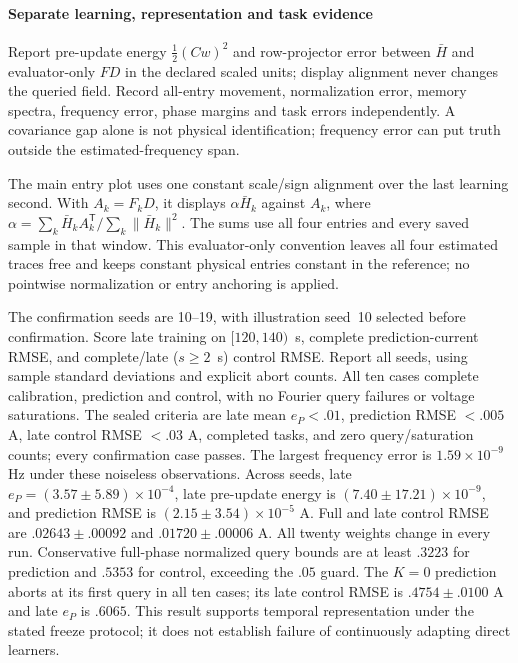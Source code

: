 \paragraph{Separate learning, representation and task evidence}
Report pre-update energy $\tfrac12(Cw)^2$ and row-projector error between
$\bar H$ and evaluator-only $FD$ in the declared scaled units; display
alignment never changes the queried field. Record all-entry movement,
normalization error, memory spectra, frequency error, phase margins and task
errors independently. A covariance gap alone is not physical identification;
frequency error can put truth outside the estimated-frequency span.

The main entry plot uses one constant scale/sign alignment over the last
learning second. With $A_k=F_kD$, it displays $\alpha\bar H_k$ against $A_k$,
where $\alpha=\sum_k\bar H_kA_k^{\mathsf T}/\sum_k\|\bar H_k\|^2$.
The sums use all four entries and every saved sample in that window. This
evaluator-only convention leaves all four estimated traces free and keeps
constant physical entries constant in the reference; no pointwise normalization
or entry anchoring is applied.

The confirmation seeds are 10--19, with illustration seed~10 selected before
confirmation. Score late training on $[120,140)$~s, complete prediction-current
RMSE, and complete/late ($s\ge2$~s) control RMSE. Report all seeds, using sample standard deviations and explicit abort counts.
All ten cases complete calibration, prediction and control, with no Fourier
query failures or voltage saturations. The sealed criteria are late mean
$e_P<.01$, prediction RMSE $<.005$ A, late control RMSE $<.03$ A,
completed tasks, and zero query/saturation counts; every confirmation case
passes. The largest frequency error is $1.59\times10^{-9}$ Hz under these
noiseless observations. Across seeds, late $e_P=(3.57\pm5.89)\times10^{-4}$,
late pre-update energy is $(7.40\pm17.21)\times10^{-9}$, and prediction RMSE
is $(2.15\pm3.54)\times10^{-5}$ A. Full and late control RMSE are
$.02643\pm.00092$ and $.01720\pm.00006$ A. All twenty weights change in
every run. Conservative full-phase normalized query bounds are at least
$.3223$ for prediction and $.5353$ for control, exceeding the $.05$ guard.
The $K=0$ prediction aborts at its first query in all ten cases; its late
control RMSE is $.4754\pm.0100$ A and late $e_P$ is $.6065$.
This result supports temporal representation under the stated freeze protocol;
it does not establish failure of continuously adapting direct learners.

